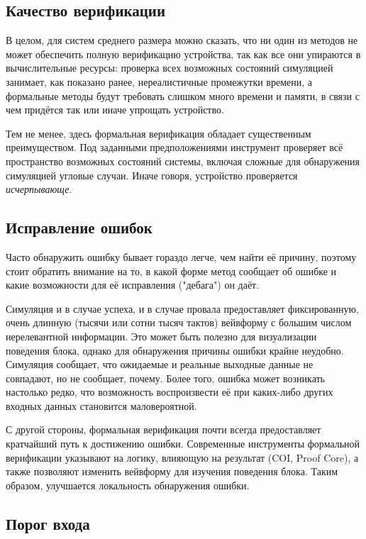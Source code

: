 \subsection{Качество верификации}

\tab В целом, для систем среднего размера можно сказать, что ни один из методов не может обеспечить полную верификацию устройства, так как все они упираются в вычислительные ресурсы: проверка всех возможных состояний симуляцией занимает, как показано ранее, нереалистичные промежутки времени, а формальные методы будут требовать слишком много времени и памяти, в связи с чем придётся так или иначе упрощать устройство. 

Тем не менее, здесь формальная верификация обладает существенным преимуществом. Под заданными предположениями инструмент проверяет всё пространство возможных состояний системы, включая сложные для обнаружения симуляцией угловые случаи. Иначе говоря, устройство проверяется \textit{исчерпывающе}. 

\subsection{Исправление ошибок}

\tab Часто обнаружить ошибку бывает гораздо легче, чем найти её причину, поэтому стоит обратить внимание на то, в какой форме метод сообщает об ошибке и какие возможности для её исправления ("дебага") он даёт.

Симуляция и в случае успеха, и в случае провала предоставляет фиксированную, очень длинную (тысячи или сотни тысяч тактов) вейвформу с большим числом нерелевантной информации. Это может быть полезно для визуализации поведения блока, однако для обнаружения причины ошибки крайне неудобно. Симуляция сообщает, что ожидаемые и реальные выходные данные не совпадают, но не сообщает, почему. Более того, ошибка может возникать настолько редко, что возможность воспроизвести её при каких-либо других входных данных становится маловероятной. 

С другой стороны, формальная верификация почти всегда предоставляет кратчайший путь к достижению ошибки. Современные инструменты формальной верификации указывают на логику, влияющую на результат (COI, Proof Core), а также позволяют изменить вейвформу для изучения поведения блока. Таким образом, улучшается локальность обнаружения ошибки. 

\subsection{Порог входа}

